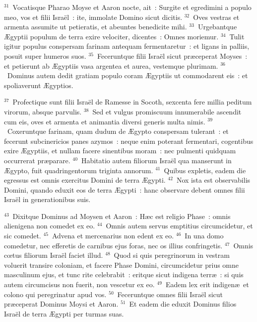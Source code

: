 ${}^{31}$~Vocatisque Pharao Moyse et Aaron nocte, ait~: Surgite et egredimini a populo meo, vos et filii Isra\"el~: ite, immolate Domino sicut dicitis.
${}^{32}$~Oves vestras et armenta assumite ut petieratis, et abeuntes benedicite mihi.
${}^{33}$~Urgebantque \AE gyptii populum de terra exire velociter, dicentes~: Omnes moriemur.
${}^{34}$~Tulit igitur populus conspersam farinam antequam fermentaretur~: et ligans in palliis, posuit super humeros suos.
${}^{35}$~Feceruntque filii Isra\"el sicut pr\ae ceperat Moyses~: et petierunt ab \AE gyptiis vasa argentea et aurea, vestemque plurimam.
${}^{36}$~Dominus autem dedit gratiam populo coram \AE gyptiis ut commodarent eis~: et spoliaverunt \AE gyptios.


${}^{37}$~Profectique sunt filii Isra\"el de Ramesse in Socoth, sexcenta fere millia peditum virorum, absque parvulis.
${}^{38}$~Sed et vulgus promiscuum innumerabile ascendit cum eis, oves et armenta et animantia diversi generis multa nimis.
${}^{39}$~Coxeruntque farinam, quam dudum de \AE gypto conspersam tulerant~: et fecerunt subcinericios panes azymos~: neque enim poterant fermentari, cogentibus exire \AE gyptiis, et nullam facere sinentibus moram~: nec pulmenti quidquam occurrerat pr\ae parare.
${}^{40}$~Habitatio autem filiorum Isra\"el qua manserunt in \AE gypto, fuit quadringentorum triginta annorum.
${}^{41}$~Quibus expletis, eadem die egressus est omnis exercitus Domini de terra \AE gypti.
${}^{42}$~Nox ista est observabilis Domini, quando eduxit eos de terra \AE gypti~: hanc observare debent omnes filii Isra\"el in generationibus suis.


${}^{43}$~Dixitque Dominus ad Moysen et Aaron~: H\ae c est religio Phase~: omnis alienigena non comedet ex eo.
${}^{44}$~Omnis autem servus emptitius circumcidetur, et sic comedet.
${}^{45}$~Advena et mercenarius non edent ex eo.
${}^{46}$~In una domo comedetur, nec efferetis de carnibus ejus foras, nec os illius confringetis.
${}^{47}$~Omnis cœtus filiorum Isra\"el faciet illud.
${}^{48}$~Quod si quis peregrinorum in vestram voluerit transire coloniam, et facere Phase Domini, circumcidetur prius omne masculinum ejus, et tunc rite celebrabit~: eritque sicut indigena terr\ae~: si quis autem circumcisus non fuerit, non vescetur ex eo.
${}^{49}$~Eadem lex erit indigen\ae\ et colono qui peregrinatur apud vos.
${}^{50}$~Feceruntque omnes filii Isra\"el sicut pr\ae ceperat Dominus Moysi et Aaron.
${}^{51}$~Et eadem die eduxit Dominus filios Isra\"el de terra \AE gypti per turmas suas.

